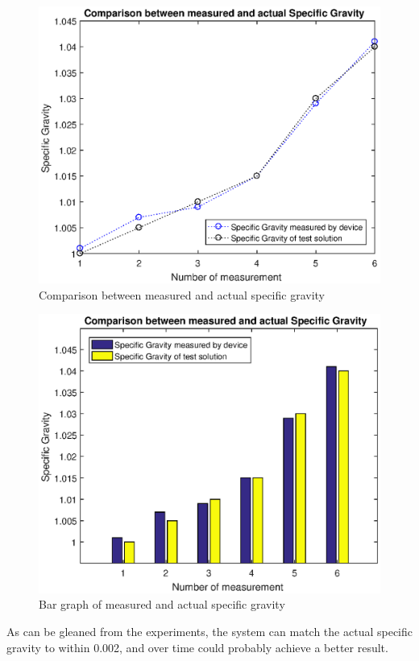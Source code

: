 \documentclass[twoside]{ctuthesis}
\theoremstyle{plain}
\theoremstyle{definition}
\theoremstyle{note}
\begin{document}
\begin{figure}[H]
	\centering
	\includegraphics[width = \textwidth]{SpecificGravityComparison}
	\caption{Comparison between measured and actual specific gravity}
\end{figure}

\begin{figure}[H]
	\centering
	\includegraphics[width = \textwidth]{ComparisonBars}
	\caption{Bar graph of measured and actual specific gravity}
\end{figure}

As can be gleaned from the experiments, the system can match the actual specific gravity to within 0.002, and over time could probably achieve a better result.
\end{document}
